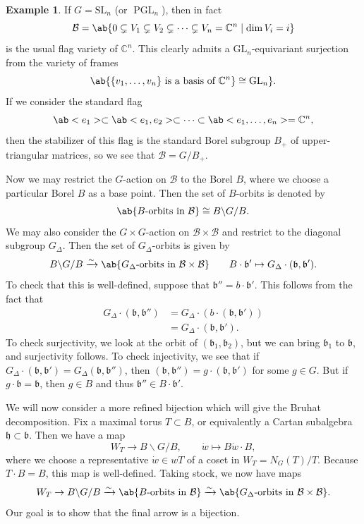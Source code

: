 \documentclass{amsart}
\theoremstyle{definition}
\newtheorem{exm}[thm]{Example}
\theoremstyle{remark}
\theoremstyle{plain}
\theoremstyle{definition}
\theoremstyle{remark}
\newcommand{\C}{\mathbb{C}}
\newcommand{\h}{\mathfrak{h}}
\renewcommand{\b}{\mathfrak{b}}
\newcommand{\mc}[1]{\mathcal{#1}}
\newcommand{\mr}[1]{\mathrm{#1}}
\newcommand{\on}[1]{\operatorname{#1}}
\newcommand{\1}{\mathbf{1}}
\newcommand{\2}{\mathbf{2}}
\newcommand{\3}{\mathbf{3}}
\newcommand{\GL}{\mr{GL}}
\newcommand{\SL}{\mr{SL}}
\begin{document}
\begin{exm}
    If \(G = \SL_n\) (or \(\on{PGL}_n\)), then in fact
    \[ \mc{B} = \ab\{ 0 \subsetneq V_1 \subsetneq V_2 \subsetneq \cdots \subsetneq V_n = \C^n \mid \dim V_i = i \} \]
    is the usual flag variety of \(\C^n\). This clearly admits a \(\GL_n\)-equivariant surjection from the variety of frames
    \[ \ab\{ \{v_1, \ldots, v_n \} \text{ is a basis of } \C^n \} \cong \GL_n \}. \]
    If we consider the standard flag
    \[ \ab<e_1> \subset \ab<e_1, e_2> \subset \cdots \subset \ab<e_1, \ldots, e_n> = \C^n, \]
    then the stabilizer of this flag is the standard Borel subgroup \(B_{+}\) of upper-triangular matrices, so we see that \(\mc{B} = G/B_+\).
\end{exm}

Now we may restrict the \(G\)-action on \(\mc{B}\) to the Borel \(B\), where we choose a particular Borel \(B\) as a base point. Then the set of \(B\)-orbits is denoted by
\[ \ab\{B\text{-orbits in }\mc{B}\} \cong B \backslash G / B. \]
We may also consider the \(G \times G\)-action on \(\mc{B} \times \mc{B}\) and restrict to the diagonal subgroup \(G_{\Delta}\). Then the set of \(G_{\Delta}\)-orbits is given by
\[ B \backslash G / B \xrightarrow{\sim} \ab\{G_{\Delta}\text{-orbits in }\mc{B} \times \mc{B}\} \qquad B \cdot \b' \mapsto G_{\Delta} \cdot (\b, \b'). \]
To check that this is well-defined, suppose that \(\b'' = b \cdot \b'\). This follows from the fact that
\begin{align*}
    G_{\Delta} \cdot (\b, \b'') &= G_{\Delta} \cdot (b \cdot (\b, \b')) \\
    &= G_{\Delta} \cdot (\b, \b').
\end{align*}
To check surjectivity, we look at the orbit of \((\b_1, \b_2)\), but we can bring \(\b_1\) to \(\b\), and surjectivity follows. To check injectivity, we see that if \(G_{\Delta} \cdot (\b, \b') = G_{\Delta}(\b, \b'')\), then \((\b, \b'') = g \cdot (\b, \b')\) for some \(g \in G\). But if \(g \cdot \b = \b\), then \(g \in B\) and thus \(\b'' \in B \cdot \b'\).

We will now consider a more refined bijection which will give the Bruhat decomposition. Fix a maximal torus \(T \subset B\), or equivalently a Cartan subalgebra \(\h \subset \b\). Then we have a map
\[ W_T \to B \backslash G / B, \qquad \dot{w} \mapsto B\dot{w} \cdot B, \]
where we choose a representative \(\dot{w} \in wT\) of a coset in \(W_T = N_G(T) / T\). Because \(T \cdot B = B\), this map is well-defined. Taking stock, we now have maps
\[ W_T \to B \backslash G / B \xrightarrow{\sim} \ab\{B\text{-orbits in }\mc{B}\} \xrightarrow{\sim} \ab\{G_{\Delta}\text{-orbits in }\mc{B} \times \mc{B}\}. \]
Our goal is to show that the final arrow is a bijection.
\end{document}
